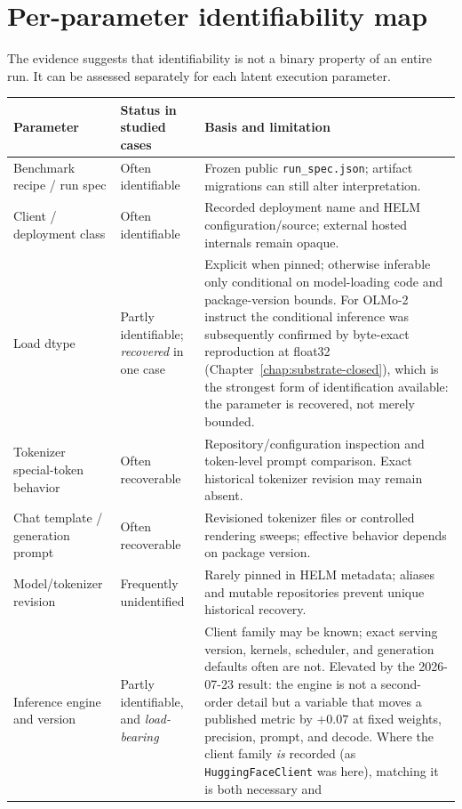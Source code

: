 \documentclass[11pt]{report}
\newcommand{\code}[1]{\texttt{#1}}
\newcommand{\file}[1]{\texttt{#1}}
\begin{document}
\section{Per-parameter identifiability map}

The evidence suggests that identifiability is not a binary property of an entire
run. It can be assessed separately for each latent execution parameter.

\begin{longtable}{@{}p{}p{}p{}@{}}
\toprule
\textbf{Parameter} & \textbf{Status in studied cases} & \textbf{Basis and limitation} \\
\midrule
\endhead
Benchmark recipe / run spec & Often identifiable & Frozen public
\file{run\_spec.json}; artifact migrations can still alter interpretation. \\
Client / deployment class & Often identifiable & Recorded deployment name and
HELM configuration/source; external hosted internals remain opaque. \\
Load dtype & Partly identifiable; \emph{recovered} in one case & Explicit when
pinned; otherwise inferable only conditional on model-loading code and
package-version bounds. For OLMo-2 instruct the conditional inference was
subsequently confirmed by byte-exact reproduction at float32
(Chapter~\ref{chap:substrate-closed}), which is the strongest form of
identification available: the parameter is recovered, not merely bounded. \\
Tokenizer special-token behavior & Often recoverable & Repository/configuration
inspection and token-level prompt comparison. Exact historical tokenizer revision
may remain absent. \\
Chat template / generation prompt & Often recoverable & Revisioned tokenizer files
or controlled rendering sweeps; effective behavior depends on package version. \\
Model/tokenizer revision & Frequently unidentified & Rarely pinned in HELM
metadata; aliases and mutable repositories prevent unique historical recovery. \\
Inference engine and version & Partly identifiable, and \emph{load-bearing} & Client
family may be known; exact serving version, kernels, scheduler, and generation
defaults often are not. Elevated by the 2026-07-23 result: the engine is not a
second-order detail but a variable that moves a published metric by $+0.07$ at fixed
weights, precision, prompt, and decode. Where the client family \emph{is} recorded
(as \code{HuggingFaceClient} was here), matching it is both necessary and

\end{longtable}
\end{document}

